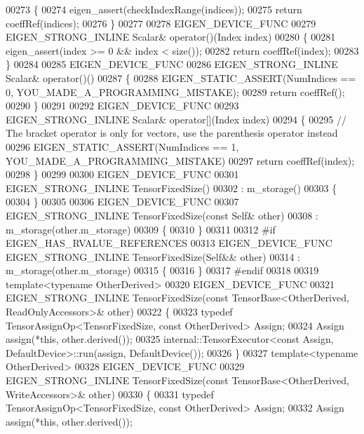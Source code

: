 \begin{DoxyCode}
00273     \{
00274       eigen\_assert(checkIndexRange(indices));
00275       \textcolor{keywordflow}{return} coeffRef(indices);
00276     \}
00277 
00278     EIGEN\_DEVICE\_FUNC
00279     EIGEN\_STRONG\_INLINE Scalar& operator()(Index index)
00280     \{
00281       eigen\_assert(index >= 0 && index < size());
00282       \textcolor{keywordflow}{return} coeffRef(index);
00283     \}
00284 
00285     EIGEN\_DEVICE\_FUNC
00286     EIGEN\_STRONG\_INLINE Scalar& operator()()
00287     \{
00288       EIGEN\_STATIC\_ASSERT(NumIndices == 0, YOU\_MADE\_A\_PROGRAMMING\_MISTAKE);
00289       \textcolor{keywordflow}{return} coeffRef();
00290     \}
00291 
00292     EIGEN\_DEVICE\_FUNC
00293     EIGEN\_STRONG\_INLINE Scalar& operator[](Index index)
00294     \{
00295       \textcolor{comment}{// The bracket operator is only for vectors, use the parenthesis operator instead}
00296       EIGEN\_STATIC\_ASSERT(NumIndices == 1, YOU\_MADE\_A\_PROGRAMMING\_MISTAKE)
00297       \textcolor{keywordflow}{return} coeffRef(index);
00298     \}
00299 
00300     EIGEN\_DEVICE\_FUNC
00301     EIGEN\_STRONG\_INLINE TensorFixedSize()
00302       : m\_storage()
00303     \{
00304     \}
00305 
00306     EIGEN\_DEVICE\_FUNC
00307     EIGEN\_STRONG\_INLINE TensorFixedSize(\textcolor{keyword}{const} Self& other)
00308       : m\_storage(other.m\_storage)
00309     \{
00310     \}
00311 
00312 \textcolor{preprocessor}{#if EIGEN\_HAS\_RVALUE\_REFERENCES}
00313     EIGEN\_DEVICE\_FUNC EIGEN\_STRONG\_INLINE TensorFixedSize(Self&& other)
00314       : m\_storage(other.m\_storage)
00315     \{
00316     \}
00317 \textcolor{preprocessor}{#endif}
00318 
00319     \textcolor{keyword}{template}<\textcolor{keyword}{typename} OtherDerived>
00320     EIGEN\_DEVICE\_FUNC
00321     EIGEN\_STRONG\_INLINE TensorFixedSize(\textcolor{keyword}{const} TensorBase<OtherDerived, ReadOnlyAccessors>& other)
00322     \{
00323       \textcolor{keyword}{typedef} TensorAssignOp<TensorFixedSize, const OtherDerived> Assign;
00324       Assign assign(*\textcolor{keyword}{this}, other.derived());
00325       internal::TensorExecutor<const Assign, DefaultDevice>::run(assign, DefaultDevice());
00326     \}
00327     \textcolor{keyword}{template}<\textcolor{keyword}{typename} OtherDerived>
00328     EIGEN\_DEVICE\_FUNC
00329     EIGEN\_STRONG\_INLINE TensorFixedSize(\textcolor{keyword}{const} TensorBase<OtherDerived, WriteAccessors>& other)
00330     \{
00331       \textcolor{keyword}{typedef} TensorAssignOp<TensorFixedSize, const OtherDerived> Assign;
00332       Assign assign(*\textcolor{keyword}{this}, other.derived());

\end{DoxyCode}
